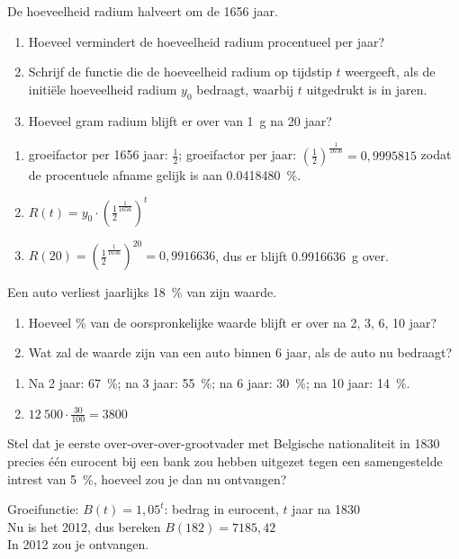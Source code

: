 \begin{oef}
 De hoeveelheid  radium halveert om de  1656 jaar.
    \begin{enumerate}
        \item Hoeveel vermindert de hoeveelheid radium
            procentueel per jaar?
        \item Schrijf de functie  die de hoeveelheid radium op tijdstip
            $t$ weergeeft, als de initi\"ele hoeveelheid radium $y_0$
            bedraagt, waarbij $t$ uitgedrukt is in jaren.
        \item Hoeveel gram radium blijft er over van \SI{1}{\gram} na 20
            jaar?
    \end{enumerate}
\begin{opl}
\begin{enumerate}
\item groeifactor per 1656 jaar: $\frac12$; groeifactor per jaar: $\left(\frac{1}{2}\right)^\frac{1}{1656}=0,9995815$ zodat de procentuele afname gelijk is aan \SI{0,0418480}{\percent}.
\item $R(t)=y_0\cdot \left(\frac{1}{2}^\frac{1}{1656}\right)^t$
\item $R(20)=\left(\frac{1}{2}^\frac{1}{1656}\right)^{20}=0,9916636$, dus er blijft \SI{0.9916636}{\gram} over.
\end{enumerate}
\end{opl}
       \end{oef}


\begin{oef}
 Een auto verliest jaarlijks \SI{18}{\percent} van zijn waarde.
    \begin{enumerate}
\item Hoeveel \% van de oorspronkelijke waarde blijft er over na 2, 3, 6, 10 jaar?
\item Wat zal de waarde zijn van een auto binnen 6 jaar, als de auto nu  bedraagt? 
\end{enumerate}
\begin{opl}
\begin{enumerate}
\item Na 2 jaar: \SI{67}{\percent}; na 3 jaar: \SI{55}{\percent}; na 6 jaar: \SI{30}{\percent}; na 10 jaar: \SI{14}{\percent}.
\item $12~500\cdot\frac{30}{100}=3800$
\end{enumerate}
\end{opl}
\end{oef}

\begin{oef}
 Stel dat je eerste over-over-over-grootvader met Belgische nationaliteit in 1830 precies \'e\'en eurocent bij een bank zou hebben uitgezet tegen een samengestelde intrest van \SI{5}{\percent}, hoeveel zou je dan nu ontvangen?
  \begin{opl}
  Groeifunctie: $B(t)=1,05^t$: bedrag in eurocent, $t$ jaar na 1830\\
  Nu is het 2012, dus bereken $B(182)=7185,42$\\
  In 2012 zou je  ontvangen.
  \end{opl}
   
        
  \end{oef}




%
